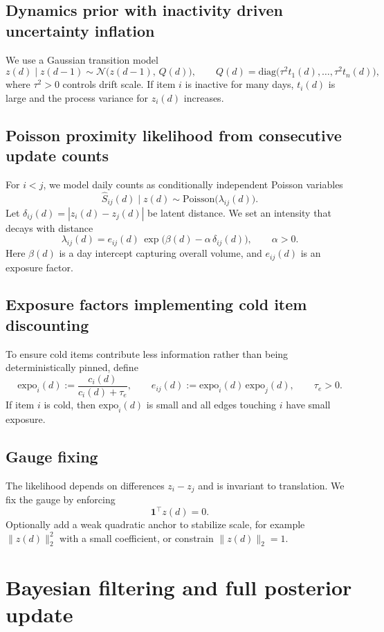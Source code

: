 \documentclass[11pt]{article}
\begin{document}
\subsection{Dynamics prior with inactivity driven uncertainty inflation}
We use a Gaussian transition model
\[
z(d)\mid z(d-1)\sim \mathcal N\!\big(z(d-1),\,Q(d)\big),
\qquad
Q(d)=\mathrm{diag}\big(\tau^2 t_1(d),\dots,\tau^2 t_n(d)\big),
\]
where $\tau^2>0$ controls drift scale.
If item $i$ is inactive for many days, $t_i(d)$ is large and the process variance for $z_i(d)$ increases.

\subsection{Poisson proximity likelihood from consecutive update counts}
For $i<j$, we model daily counts as conditionally independent Poisson variables
\[
\widehat S_{ij}(d)\mid z(d)\sim \mathrm{Poisson}\big(\lambda_{ij}(d)\big).
\]
Let $\delta_{ij}(d)=|z_i(d)-z_j(d)|$ be latent distance.
We set an intensity that decays with distance
\[
\lambda_{ij}(d)
=
e_{ij}(d)\,\exp\!\Big(\beta(d)-\alpha\,\delta_{ij}(d)\Big),
\qquad \alpha>0.
\]
Here $\beta(d)$ is a day intercept capturing overall volume, and $e_{ij}(d)$ is an exposure factor.

\subsection{Exposure factors implementing cold item discounting}
To ensure cold items contribute less information rather than being deterministically pinned, define
\[
\mathrm{expo}_i(d) := \frac{c_i(d)}{c_i(d)+\tau_e},
\qquad
e_{ij}(d) := \mathrm{expo}_i(d)\,\mathrm{expo}_j(d),
\qquad \tau_e>0.
\]
If item $i$ is cold, then $\mathrm{expo}_i(d)$ is small and all edges touching $i$ have small exposure.

\subsection{Gauge fixing}
The likelihood depends on differences $z_i-z_j$ and is invariant to translation.
We fix the gauge by enforcing
\[
\mathbf{1}^\top z(d)=0.
\]
Optionally add a weak quadratic anchor to stabilize scale, for example $\|z(d)\|_2^2$ with a small coefficient, or constrain $\|z(d)\|_2=1$.

\section{Bayesian filtering and full posterior update}
\end{document}
